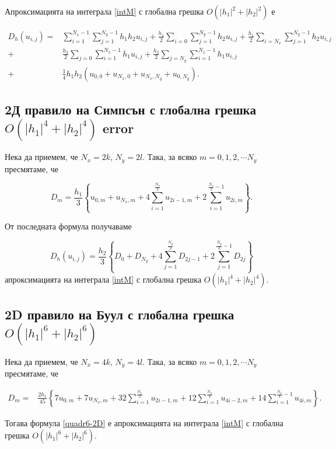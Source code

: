 \documentclass{article}
\begin{document}
Апроксимацията на интеграла \eqref{intM} с глобална грешка $O(|h_1|^2+|h_2|^2)$ е

\begin{align}\label{quadr2}
D_h(u_{i,j}) =& \sum_{i=1}^{N_x-1} \sum_{j=1}^{N_y-1} h_1 h_2 u_{i,j}
+\frac{h_1}{2}\sum_{i=0} \sum_{j=1}^{N_y-1} h_2 u_{i,j}
+\frac{h_1}{2}\sum_{i=N_x} \sum_{j=1}^{N_y-1} h_2 u_{i,j} \nonumber\\
+&\frac{h_2}{2}\sum_{j=0} \sum_{i=1}^{N_x-1} h_1 u_{i,j}
+\frac{h_2}{2}\sum_{j=N_y} \sum_{i=1}^{N_x-1} h_1 u_{i,j}
\nonumber\\
+&\frac{1}{4}h_1 h_2 \left(u_{0,0}+u_{N_x,0}+u_{N_x,N_y}+u_{0,N_y}
\right).
\end{align}

\subsection{ 2Д правило на Симпсън с глобална грешка $O(|h_1|^4+|h_2|^4)$ error}

Нека да приемем, че $N_x=2k$, $N_y=2 l$. Така, за всяко $m=0,1,2,\cdots N_y$ пресмятаме, че

$$D_m= \frac{h_1 }{3} 
\left\{ u_{0,m}+u_{N_x,m}+ 4 \sum_{i=1}^{\frac{N_x}{2}}   u_{2i-1,m}
 +2 \sum_{i=1}^{\frac{N_x}{2}-1} u_{2i,m} \right\}.$$


От последната формула получаваме

\begin{equation}\label{quadr4}
D_h(u_{i,j}) =\frac{h_2 }{3} 
\left\{ D_{0}+D_{N_y}+ 4 \sum_{j=1}^{\frac{N_y}{2}}   D_{2j-1}
 +2 \sum_{j=1}^{{\frac{N_y}{2}}-1} D_{2j} \right\}
\end{equation}
апроксимацията на интеграла \eqref{intM} с глобална грешка $O(|h_1|^4+|h_2|^4)$.


\subsection{ 2D правило на Буул с глобална грешка $O(|h_1|^6+|h_2|^6)$}

Нека да приемем, че $N_x=4k$, $N_y=4 l$. Така, за всяко $m=0,1,2,\cdots N_y$ пресмятаме, че

\begin{align*}
D_m =& \frac{2h_1}{45} 
\left\{
7u_{0,m}+7u_{N_x,m}+32 \sum_{i=1}^{\frac{N_x}{2}}u_{2i-1,m}
+12\sum_{i=1}^{\frac{N_x}{4}}u_{4i-2,m}
+14 \sum_{i=1}^{\frac{N_x}{4}-1}u_{4i,m}
\right\}.
\end{align*}

Тогава формула \eqref{quadr6-2D} е апроксимацията на интеграла \eqref{intM} с глобална грешка $O(|h_1|^6+|h_2|^6)$.
\end{document}
